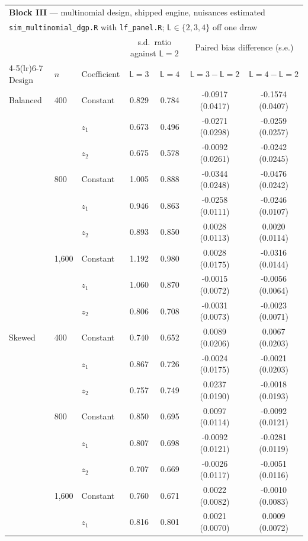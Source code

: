 \begin{tabular}{lllcccc}
\toprule
\multicolumn{7}{l}{\textbf{Block III} --- multinomial design, shipped engine, nuisances estimated} \\
\multicolumn{7}{l}{\quad \texttt{sim\_multinomial\_dgp.R} with \texttt{lf\_panel.R}; $\mathsf L\in\{2,3,4\}$ off one draw} \\
\midrule
& & & \multicolumn{2}{c}{s.d.\ ratio against $\mathsf L=2$} & \multicolumn{2}{c}{Paired bias difference (s.e.)} \\
\cmidrule(lr){4-5}\cmidrule(lr){6-7}
Design & $n$ & Coefficient & $\mathsf L=3$ & $\mathsf L=4$ & $\mathsf L=3-\mathsf L=2$ & $\mathsf L=4-\mathsf L=2$ \\
\midrule
Balanced & 400 & Constant & 0.829 & 0.784 & -0.0917 (0.0417) & -0.1574 (0.0407) \\
 &  & $z_1$ & 0.673 & 0.496 & -0.0271 (0.0298) & -0.0259 (0.0257) \\
 &  & $z_2$ & 0.675 & 0.578 & -0.0092 (0.0261) & -0.0242 (0.0245) \\
 & 800 & Constant & 1.005 & 0.888 & -0.0344 (0.0248) & -0.0476 (0.0242) \\
 &  & $z_1$ & 0.946 & 0.863 & -0.0258 (0.0111) & -0.0246 (0.0107) \\
 &  & $z_2$ & 0.893 & 0.850 & 0.0028 (0.0113) & 0.0020 (0.0114) \\
 & 1,600 & Constant & 1.192 & 0.980 & 0.0028 (0.0175) & -0.0316 (0.0144) \\
 &  & $z_1$ & 1.060 & 0.870 & -0.0015 (0.0072) & -0.0056 (0.0064) \\
 &  & $z_2$ & 0.806 & 0.708 & -0.0031 (0.0073) & -0.0023 (0.0071) \\
\addlinespace
Skewed & 400 & Constant & 0.740 & 0.652 & 0.0089 (0.0206) & 0.0067 (0.0203) \\
 &  & $z_1$ & 0.867 & 0.726 & -0.0024 (0.0175) & -0.0021 (0.0203) \\
 &  & $z_2$ & 0.757 & 0.749 & 0.0237 (0.0190) & -0.0018 (0.0193) \\
 & 800 & Constant & 0.850 & 0.695 & 0.0097 (0.0114) & -0.0092 (0.0121) \\
 &  & $z_1$ & 0.807 & 0.698 & -0.0092 (0.0121) & -0.0281 (0.0119) \\
 &  & $z_2$ & 0.707 & 0.669 & -0.0026 (0.0117) & -0.0051 (0.0116) \\
 & 1,600 & Constant & 0.760 & 0.671 & 0.0022 (0.0082) & -0.0010 (0.0083) \\
 &  & $z_1$ & 0.816 & 0.801 & 0.0021 (0.0070) & 0.0009 (0.0072) \\

\end{tabular}
